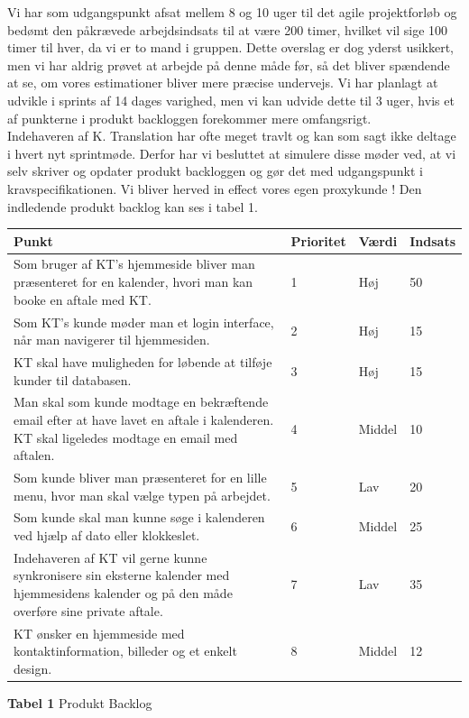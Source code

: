 \documentclass[12pt]{article}   %
\begin{document}
Vi har som udgangspunkt afsat mellem 8 og 10 uger til det agile projektforløb
og bedømt den påkrævede arbejdsindsats til at være 200 timer, hvilket vil sige 100
timer til hver, da vi er to mand i gruppen. Dette overslag er dog yderst
usikkert, men vi har aldrig prøvet at arbejde på denne måde før, så det bliver
spændende at se, om vores estimationer bliver mere præcise undervejs. Vi har
planlagt at udvikle i sprints af 14 dages varighed, men vi kan udvide dette til 3
uger, hvis et af punkterne i produkt backloggen forekommer mere omfangsrigt.\\
Indehaveren af K. Translation har ofte meget travlt og kan som sagt ikke
deltage i hvert nyt sprintmøde. Derfor har vi besluttet at simulere disse
møder ved, at vi selv skriver og opdater produkt backloggen og gør det med
udgangspunkt i kravspecifikationen. Vi bliver herved in effect vores egen 
proxykunde ! Den indledende produkt backlog kan ses i tabel 1.

\begin{center}
	\begin{tabular}{|p{8cm}|l|l|l|}
		\hline
Punkt & Prioritet & Værdi & Indsats \\ \hline
Som bruger af KT's hjemmeside bliver man præsenteret for en kalender, hvori man
kan booke en aftale med KT. & 1 & Høj &  50 \\ \hline
Som KT's kunde møder man et login interface, når man navigerer til hjemmesiden. & 2 &
Høj & 15  \\ \hline
KT skal have muligheden for løbende at tilføje kunder til databasen. & 3 & Høj
& 15 \\ \hline
Man skal som kunde modtage en bekræftende email efter at have lavet en aftale
i kalenderen. KT skal ligeledes modtage en email med aftalen. & 4 & Middel & 10  \\ \hline
Som kunde bliver man præsenteret for en lille menu, hvor man skal vælge typen
på arbejdet. & 5 & Lav & 20\\ \hline
Som kunde skal man kunne søge i kalenderen ved hjælp af dato eller klokkeslet.
& 6  & Middel &  25 \\ \hline
Indehaveren af KT vil gerne kunne synkronisere sin eksterne kalender med
hjemmesidens kalender og på den måde overføre sine private aftale. & 7 & Lav &
 35 \\ \hline
KT ønsker en hjemmeside med kontaktinformation, billeder og et enkelt design.
& 8 & Middel & 12 \\ \hline
\end{tabular}
\end{center}
\begin{center}\textbf{Tabel 1} Produkt Backlog
\end{center}
\vspace{0.5cm}
\end{document}
